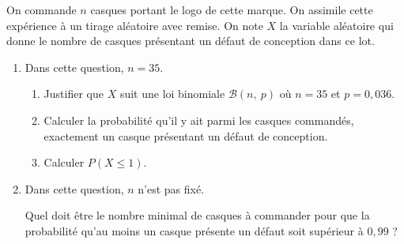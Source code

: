 \documentclass[10pt]{article}
\begin{document}
\medskip

On commande $n$ casques portant le logo de cette marque. On assimile cette expérience à
un tirage aléatoire avec remise. On note $X$ la variable aléatoire qui donne le nombre de casques présentant un défaut de conception dans ce lot.

\medskip

\begin{enumerate}
\item Dans cette question, $n = 35$.
	\begin{enumerate}
		\item Justifier que $X$ suit une loi binomiale $\mathcal{B}(n,~p)$ où $n = 35$ et $p = 0,036$.
		\item Calculer la probabilité qu'il y ait parmi les casques commandés, exactement un casque présentant un défaut de conception.
		\item Calculer $P(X \leqslant 1)$.
	\end{enumerate}	
\item Dans cette question, $n$ n'est pas fixé.

Quel doit être le nombre minimal de casques à commander pour que la probabilité 
 qu'au moins un casque présente un défaut soit supérieur à $0,99$ ?
\end{enumerate}

\bigskip
\end{document}
